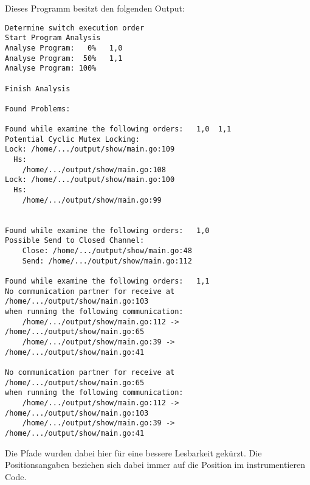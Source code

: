 Dieses Programm besitzt den folgenden Output:
\begin{verbatim}
Determine switch execution order
Start Program Analysis
Analyse Program:   0%   1,0
Analyse Program:  50%   1,1
Analyse Program: 100%

Finish Analysis

Found Problems:

Found while examine the following orders:   1,0  1,1
Potential Cyclic Mutex Locking:
Lock: /home/.../output/show/main.go:109
  Hs:
    /home/.../output/show/main.go:108
Lock: /home/.../output/show/main.go:100
  Hs:
    /home/.../output/show/main.go:99


Found while examine the following orders:   1,0
Possible Send to Closed Channel:
    Close: /home/.../output/show/main.go:48
    Send: /home/.../output/show/main.go:112

Found while examine the following orders:   1,1
No communication partner for receive at /home/.../output/show/main.go:103 
when running the following communication:
    /home/.../output/show/main.go:112 -> /home/.../output/show/main.go:65
    /home/.../output/show/main.go:39 -> /home/.../output/show/main.go:41

No communication partner for receive at /home/.../output/show/main.go:65 
when running the following communication:
    /home/.../output/show/main.go:112 -> /home/.../output/show/main.go:103
    /home/.../output/show/main.go:39 -> /home/.../output/show/main.go:41
\end{verbatim}
Die Pfade wurden dabei hier für eine bessere Lesbarkeit gekürzt.
Die Positionsangaben beziehen sich dabei immer auf die Position im 
instrumentieren Code.   
